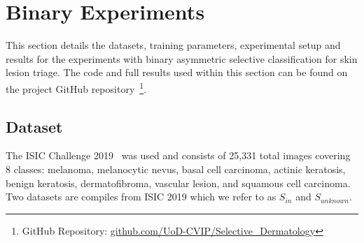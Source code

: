 \section{Binary Experiments}
\label{sec:selective_binary_experiment}
This section details the datasets, training parameters, experimental setup and results for the experiments with binary asymmetric selective classification for skin lesion triage. The code and full results used within this section can be found on the project GitHub repository~\footnote{GitHub Repository: \url{github.com/UoD-CVIP/Selective_Dermatology}}.

\subsection{Dataset}
The ISIC Challenge 2019~\citep{codella2018skin,Combalia2019,Tschandl2018} was used and consists of 25,331 total images covering 8 classes: melanoma, melanocytic nevus, basal cell carcinoma, actinic keratosis, benign keratosis, dermatofibroma, vascular lesion, and squamous cell carcinoma. Two datasets are compiles from ISIC 2019 which we refer to as \(S_{in}\) and \(S_{unknown}\). 

